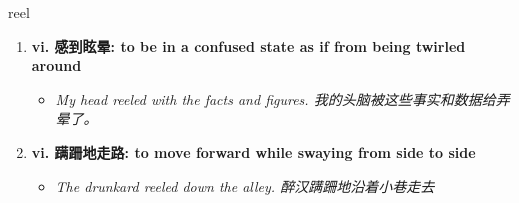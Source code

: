 
\begin{frame}
{\huge reel}
\begin{center}
\begin{enumerate}\Large
  \item \textbf{vi. 感到眩晕: to be in a confused state as if from being twirled around}
  \begin{itemize}
    \item \em{\Large{My head reeled with the facts and figures. 我的头脑被这些事实和数据给弄晕了。}}
  \end{itemize}
  \item \textbf{vi. 蹒跚地走路: to move forward while swaying from side to side}
  \begin{itemize}
    \item \em{\Large{The drunkard reeled down the alley. 醉汉蹒跚地沿着小巷走去}}
  \end{itemize}
\end{enumerate}
\end{center}
\end{frame}
